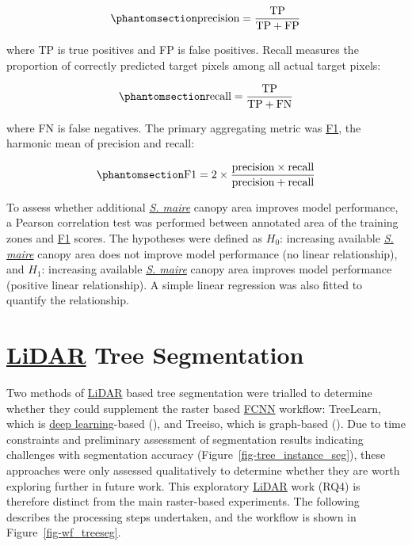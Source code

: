 \documentclass[
]{scrreprt}
\begin{document}
\begin{equation}\phantomsection\label{eq-precision}{
\text{precision} = \frac{\text{TP}}{\text{TP} + \text{FP}}
}\end{equation}

where TP is true positives and FP is false positives. Recall measures
the proportion of correctly predicted target pixels among all actual
target pixels:

\begin{equation}\phantomsection\label{eq-recall}{
\text{recall} = \frac{\text{TP}}{\text{TP} + \text{FN}}
}\end{equation}

where FN is false negatives. The primary aggregating metric was
\hyperref[acronyms_F1]{F1}, the harmonic mean of precision and recall:

\begin{equation}\phantomsection\label{eq-F1}{
\text{F1} = 2 \times \frac{\text{precision} \times \text{recall}}{\text{precision} + \text{recall}}
}\end{equation}

To assess whether additional \hyperref[acronyms_SM]{\emph{S. maire}}
canopy area improves model performance, a Pearson correlation test was
performed between annotated area of the training zones and
\hyperref[acronyms_F1]{F1} scores. The hypotheses were defined as
\(H_0\): increasing available \hyperref[acronyms_SM]{\emph{S. maire}}
canopy area does not improve model performance (no linear relationship),
and \(H_1\): increasing available \hyperref[acronyms_SM]{\emph{S.
maire}} canopy area improves model performance (positive linear
relationship). A simple linear regression was also fitted to quantify
the relationship.

\section{\texorpdfstring{\hyperref[acronyms_LiDAR]{LiDAR} Tree
Segmentation}{LiDAR Tree Segmentation}}\label{tree-segmentation}

Two methods of \hyperref[acronyms_LiDAR]{LiDAR} based tree segmentation
were trialled to determine whether they could supplement the raster
based \hyperref[acronyms_FCNN]{FCNN} workflow: TreeLearn, which is
\hyperref[acronyms_DL]{deep learning}-based
(), and
Treeiso, which is graph-based (). Due to time constraints and preliminary assessment of
segmentation results indicating challenges with segmentation accuracy
(Figure~\ref{fig-tree_instance_seg}), these approaches were only
assessed qualitatively to determine whether they are worth exploring
further in future work. This exploratory
\hyperref[acronyms_LiDAR]{LiDAR} work (RQ4) is therefore distinct from
the main raster-based experiments. The following describes the
processing steps undertaken, and the workflow is shown in
Figure~\ref{fig-wf_treeseg}.
\end{document}
